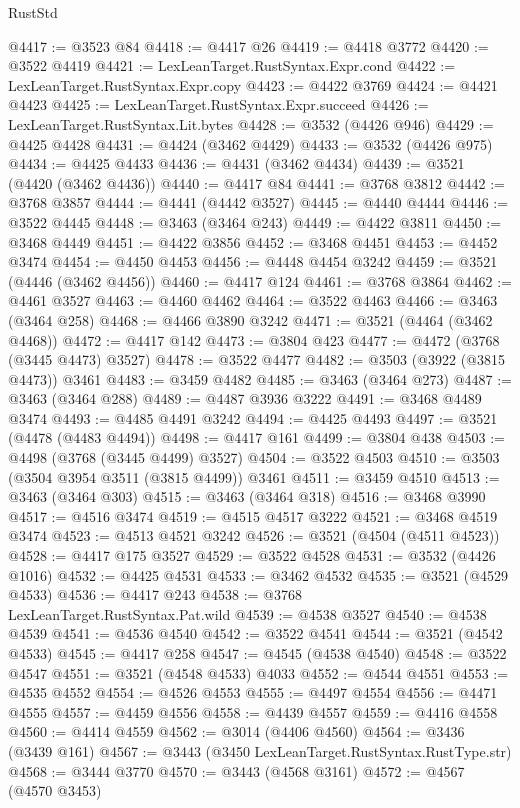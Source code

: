 \begin{lexlean}{RustStd}
\begin{coremodule}
@4417 := @3523 @84
@4418 := @4417 @26
@4419 := @4418 @3772
@4420 := @3522 @4419
@4421 := LexLeanTarget.RustSyntax.Expr.cond
@4422 := LexLeanTarget.RustSyntax.Expr.copy
@4423 := @4422 @3769
@4424 := @4421 @4423
@4425 := LexLeanTarget.RustSyntax.Expr.succeed
@4426 := LexLeanTarget.RustSyntax.Lit.bytes
@4428 := @3532 (@4426 @946)
@4429 := @4425 @4428
@4431 := @4424 (@3462 @4429)
@4433 := @3532 (@4426 @975)
@4434 := @4425 @4433
@4436 := @4431 (@3462 @4434)
@4439 := @3521 (@4420 (@3462 @4436))
@4440 := @4417 @84
@4441 := @3768 @3812
@4442 := @3768 @3857
@4444 := @4441 (@4442 @3527)
@4445 := @4440 @4444
@4446 := @3522 @4445
@4448 := @3463 (@3464 @243)
@4449 := @4422 @3811
@4450 := @3468 @4449
@4451 := @4422 @3856
@4452 := @3468 @4451
@4453 := @4452 @3474
@4454 := @4450 @4453
@4456 := @4448 @4454 @3242
@4459 := @3521 (@4446 (@3462 @4456))
@4460 := @4417 @124
@4461 := @3768 @3864
@4462 := @4461 @3527
@4463 := @4460 @4462
@4464 := @3522 @4463
@4466 := @3463 (@3464 @258)
@4468 := @4466 @3890 @3242
@4471 := @3521 (@4464 (@3462 @4468))
@4472 := @4417 @142
@4473 := @3804 @423
@4477 := @4472 (@3768 (@3445 @4473) @3527)
@4478 := @3522 @4477
@4482 := @3503 (@3922 (@3815 @4473)) @3461
@4483 := @3459 @4482
@4485 := @3463 (@3464 @273)
@4487 := @3463 (@3464 @288)
@4489 := @4487 @3936 @3222
@4491 := @3468 @4489 @3474
@4493 := @4485 @4491 @3242
@4494 := @4425 @4493
@4497 := @3521 (@4478 (@4483 @4494))
@4498 := @4417 @161
@4499 := @3804 @438
@4503 := @4498 (@3768 (@3445 @4499) @3527)
@4504 := @3522 @4503
@4510 := @3503 (@3504 @3954 @3511 (@3815 @4499)) @3461
@4511 := @3459 @4510
@4513 := @3463 (@3464 @303)
@4515 := @3463 (@3464 @318)
@4516 := @3468 @3990
@4517 := @4516 @3474
@4519 := @4515 @4517 @3222
@4521 := @3468 @4519 @3474
@4523 := @4513 @4521 @3242
@4526 := @3521 (@4504 (@4511 @4523))
@4528 := @4417 @175 @3527
@4529 := @3522 @4528
@4531 := @3532 (@4426 @1016)
@4532 := @4425 @4531
@4533 := @3462 @4532
@4535 := @3521 (@4529 @4533)
@4536 := @4417 @243
@4538 := @3768 LexLeanTarget.RustSyntax.Pat.wild
@4539 := @4538 @3527
@4540 := @4538 @4539
@4541 := @4536 @4540
@4542 := @3522 @4541
@4544 := @3521 (@4542 @4533)
@4545 := @4417 @258
@4547 := @4545 (@4538 @4540)
@4548 := @3522 @4547
@4551 := @3521 (@4548 @4533) @4033
@4552 := @4544 @4551
@4553 := @4535 @4552
@4554 := @4526 @4553
@4555 := @4497 @4554
@4556 := @4471 @4555
@4557 := @4459 @4556
@4558 := @4439 @4557
@4559 := @4416 @4558
@4560 := @4414 @4559
@4562 := @3014 (@4406 @4560)
@4564 := @3436 (@3439 @161)
@4567 := @3443 (@3450 LexLeanTarget.RustSyntax.RustType.str)
@4568 := @3444 @3770
@4570 := @3443 (@4568 @3161)
@4572 := @4567 (@4570 @3453)

\end{coremodule}
\end{lexlean}
